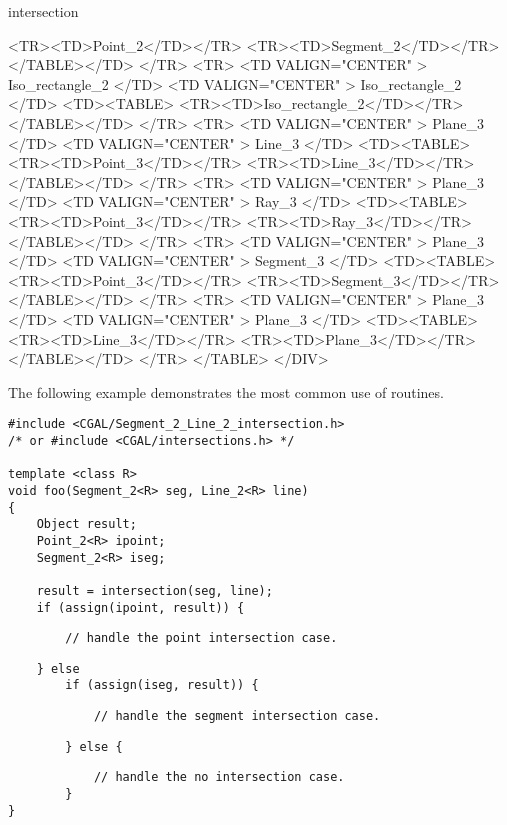 \begin{ccRefFunction}{intersection}
\begin{ccHtmlOnly}
	<TR><TD>Point_2</TD></TR>
	<TR><TD>Segment_2</TD></TR>
      </TABLE></TD>
</TR>
<TR>
    <TD VALIGN="CENTER" > Iso_rectangle_2 </TD>
    <TD VALIGN="CENTER" > Iso_rectangle_2 </TD>
    <TD><TABLE>
	<TR><TD>Iso_rectangle_2</TD></TR>
      </TABLE></TD>
</TR>
<TR>
    <TD VALIGN="CENTER" > Plane_3 </TD>
    <TD VALIGN="CENTER" > Line_3 </TD>
    <TD><TABLE>
	<TR><TD>Point_3</TD></TR>
	<TR><TD>Line_3</TD></TR>
        </TABLE></TD>
</TR>
<TR>
    <TD VALIGN="CENTER" > Plane_3 </TD>
    <TD VALIGN="CENTER" > Ray_3 </TD>
    <TD><TABLE>
	<TR><TD>Point_3</TD></TR>
	<TR><TD>Ray_3</TD></TR>
        </TABLE></TD>
</TR>
<TR>
    <TD VALIGN="CENTER" > Plane_3 </TD>
    <TD VALIGN="CENTER" > Segment_3 </TD>
    <TD><TABLE>
	<TR><TD>Point_3</TD></TR>
	<TR><TD>Segment_3</TD></TR>
        </TABLE></TD>
</TR>
<TR>
    <TD VALIGN="CENTER" > Plane_3 </TD>
    <TD VALIGN="CENTER" > Plane_3 </TD>
    <TD><TABLE>
	<TR><TD>Line_3</TD></TR>
	<TR><TD>Plane_3</TD></TR>
        </TABLE></TD>
</TR>
</TABLE>
</DIV>
\end{ccHtmlOnly}

\ccExample

The following example demonstrates the most common use of 
 routines.
\begin{verbatim}
#include <CGAL/Segment_2_Line_2_intersection.h>
/* or #include <CGAL/intersections.h> */

template <class R>
void foo(Segment_2<R> seg, Line_2<R> line)
{
    Object result;
    Point_2<R> ipoint;
    Segment_2<R> iseg;

    result = intersection(seg, line);
    if (assign(ipoint, result)) {
\end{verbatim}%
\ccHtmlLinksOff%
\begin{verbatim}
        // handle the point intersection case.
\end{verbatim}%
\ccHtmlLinksOn%
\begin{verbatim}
    } else
        if (assign(iseg, result)) {
\end{verbatim}%
\ccHtmlLinksOff%
\begin{verbatim}
            // handle the segment intersection case.
\end{verbatim}%
\ccHtmlLinksOn%
\begin{verbatim}
        } else {
\end{verbatim}%
\ccHtmlLinksOff%
\begin{verbatim}
            // handle the no intersection case.
        }
}
\end{verbatim}%
\ccHtmlLinksOn%

\ccSeeAlso
{} \\
 \\ 
 \\

\end{ccRefFunction}

  

